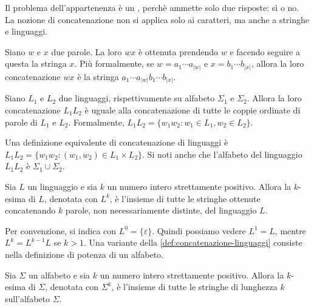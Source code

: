 Il problema dell'appartenenza è un , perchè
ammette solo due risposte: sì o no.
La nozione di  concatenazione non si applica solo ai caratteri, ma anche a stringhe e linguaggi.


\begin{definition}[Concatenazione]\label{def:concatenazione-parole}
	Siano $w$ e $x$ due parole.
	La loro  $wx$ è ottenuta prendendo $w$ e facendo seguire a questa la stringa  $x$.
	Più formalmente, se $w=a_{1}\cdots a_{|w|}$ e $x=b_{1}\cdots b_{|x|}$, allora la loro concatenazione $wx$ è la stringa
	$a_{1}\cdots a_{|w|} b_{1}\cdots b_{|x|}$.
\end{definition}

\begin{definition}\label{def:concatenazione-linguaggi}
	Siano $L_{1}$ e $L_{2}$ due linguaggi, rispettivamente su alfabeto $\Sigma_{1}$ e $\Sigma_{2}$.
	Allora la loro concatenazione $L_{1}L_{2}$ è uguale alla concatenazione di tutte le coppie ordinate di parole di $L_{1}$
	e $L_2$.
	Formalmente, $L_{1}L_{2} = \{ w_{1}w_2 : w_{1}\in L_{1}, w_{2}\in L_2\}$.
\end{definition}

Una definizione equivalente di concatenazione di linguaggi è $L_{1}L_{2} = \{ w_{1}w_2 : (w_{1}, w_{2})\in L_{1} \times L_2\}$.
Si noti anche che l'alfabeto del linguaggio $L_1 L_2$ è $\Sigma_{1} \cup \Sigma_{2}$.


\begin{definition}\label{def:potenza-linguaggio}
	Sia $L$ un linguaggio e sia $k$ un numero intero strettamente positivo.
	Allora la $k$-esima  di $L$, denotata con $L^k$, è l'insieme di tutte le stringhe ottenute concatenando
	$k$ parole, non necessariamente distinte, del linguaggio $L$.
\end{definition}

Per convenzione, si indica con $L^{0} = \{\varepsilon\}$.
Quindi possiamo vedere $L^{1} =L$, mentre $L^{k} = L^{k-1} L$ se $k>1$.
Una variante della \cref{def:concatenazione-linguaggi} consiste nella definizione di potenza di un alfabeto.

\begin{definition}\label{def:potenza-alfabeto}
	Sia $\Sigma$ un alfabeto e sia $k$ un numero intero strettamente positivo.
	Allora la $k$-esima  di $\Sigma$, denotata con $\Sigma^k$, è l'insieme di tutte le stringhe di
	lunghezza $k$ sull'alfabeto $\Sigma$.
\end{definition}

